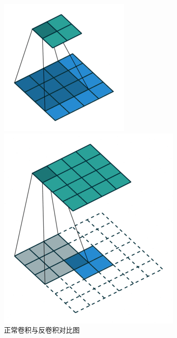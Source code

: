 \documentclass[cn]{elegantbook}
\begin{document}
\begin{figure}
	\centering
	\begin{minipage}[t]{0.45\textwidth}
		\centering
		\includegraphics[width=\textwidth]{images/no_padding_no_strides-0.png}
	\end{minipage}
	\begin{minipage}[t]{0.45\textwidth}
		\centering
		\includegraphics[width=\textwidth]{images/no_padding_no_strides_transposed-0.png}
	\end{minipage}
	\caption{\label{deconv}正常卷积与反卷积对比图}
\end{figure}
\end{document}
